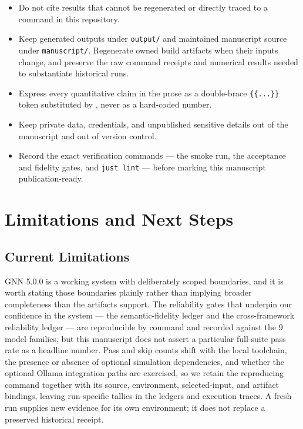 \documentclass[
  english,
  9pt,
]{extarticle}
\providecommand{\tightlist}{%
  \setlength{\itemsep}{0pt}\setlength{\parskip}{0pt}}
\begin{document}
\begin{itemize}
\tightlist
\item
  Do not cite results that cannot be regenerated or directly traced to a
  command in this repository.
\item
  Keep generated outputs under \texttt{output/} and maintained
  manuscript source under \texttt{manuscript/}. Regenerate owned build
  artifacts when their inputs change, and preserve the raw command
  receipts and numerical results needed to substantiate historical runs.
\item
  Express every quantitative claim in the prose as a double-brace
  \texttt{\{\{...\}\}} token substituted by
  , never as a
  hard-coded number.
\item
  Keep private data, credentials, and unpublished sensitive details out
  of the manuscript and out of version control.
\item
  Record the exact verification commands --- the smoke run, the
  acceptance and fidelity gates, and \texttt{just\ lint} --- before
  marking this manuscript publication-ready.
\end{itemize}

\newpage

\section{Limitations and Next Steps}\label{sec:limitations_next_steps}

\subsection{Current Limitations}\label{current-limitations}

GNN 5.0.0 is a working system with deliberately scoped boundaries, and
it is worth stating those boundaries plainly rather than implying
broader completeness than the artifacts support. The reliability gates
that underpin our confidence in the system --- the semantic-fidelity
ledger and the cross-framework reliability ledger --- are reproducible
by command and recorded against the 9 model families, but this
manuscript does not assert a particular full-suite pass rate as a
headline number. Pass and skip counts shift with the local toolchain,
the presence or absence of optional simulation dependencies, and whether
the optional Ollama integration paths are exercised, so we retain the
reproducing command together with its source, environment,
selected-input, and artifact bindings, leaving run-specific tallies in
the ledgers and execution traces. A fresh run supplies new evidence for
its own environment; it does not replace a preserved historical receipt.
\end{document}
